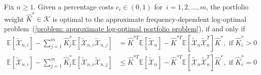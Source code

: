 \documentclass[10pt]{article} %
\begin{document}
	\begin{lemmarep} \label{lemma: Optimality conditions}
		Fix $n \geq 1.$
		Given a percentage costs $c_i \in (0,1)$ for~$i=1,2,\ldots,m$, the portfolio weight $\widehat{K}^{*} \in \mathcal{K}$ is optimal to the approximate frequency-dependent log-optimal problem~(\ref{problem: approximate log-optimal portfolio problem}), if and only if 
		\begin{align} \label{eq:condition 1}
			\mathbb{E}\left[\widetilde{\mathcal{X}}_{n,i}\right] 
			-\sum_{j=1}^m \widehat{K}_j^* \mathbb{E}\left[\widetilde{\mathcal{X}}_{n,i} \widetilde{\mathcal{X}}_{n,j} \right] 
			&= \widehat{K}^{*T} \mathbb{E}\left[ \widetilde{\mathcal{X}}_{n} \right]
			- \widehat{K}^{*T} \mathbb{E}\left[ \widetilde{\mathcal{X}}_n \widetilde{\mathcal{X}}_n^T \right] \widehat{K}^*,
			\text{ if $\widehat{K}_i^* > 0$ }\\
			\mathbb{E}\left[\widetilde{\mathcal{X}}_{n,i}\right] 
			-\sum_{j=1}^m \widehat{K}_j^* \mathbb{E}\left[\widetilde{\mathcal{X}}_{n,i} \widetilde{\mathcal{X}}_{n,j} \right] 
			&\leq \widehat{K}^{*T} \mathbb{E}\left[ \widetilde{\mathcal{X}}_{n} \right]
			- \widehat{K}^{*T} \mathbb{E}\left[ \widetilde{\mathcal{X}}_n \widetilde{\mathcal{X}}_n^T \right] \widehat{K}^*,
			\text{ if $\widehat{K}_i^* = 0$ }\label{eq:condition 2}
		\end{align}
	\end{lemmarep}
	
\end{document}

